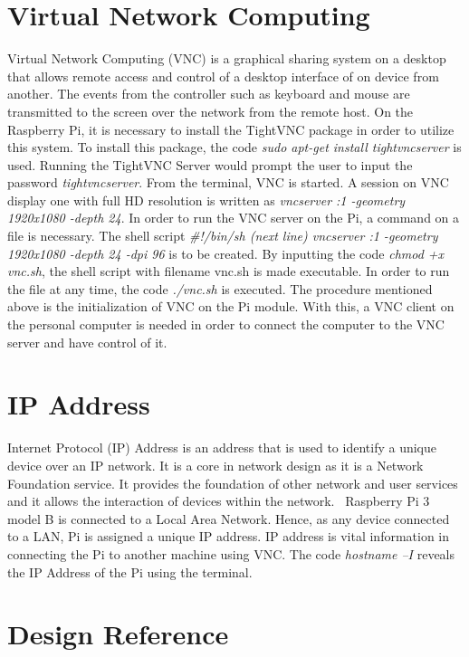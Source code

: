 \section{Virtual Network Computing}
Virtual Network Computing (VNC) is a graphical sharing system on a desktop that allows remote access and control of a desktop interface of on device from another. The events from the controller such as keyboard and mouse are transmitted to the screen over the network from the remote host. 
	On the Raspberry Pi, it is necessary to install the TightVNC package in order to utilize this system. To install this package, the code  \textsl{sudo apt-get install tightvncserver} is used. Running the TightVNC Server would prompt the user to input the password \textsl{tightvncserver}. From the terminal, VNC is started. A session on VNC display one with full HD resolution is written as \textsl{vncserver :1 -geometry 1920x1080 -depth 24}.
	In order to run the VNC server on the Pi, a command on a file is necessary. The shell script \textsl{#!/bin/sh (next line) vncserver :1 -geometry 1920x1080 -depth 24 -dpi 96} is to be created. By inputting the code \textsl{chmod +x vnc.sh}, the shell script with filename vnc.sh is made executable. In order to run the file at any time, the code \textsl{./vnc.sh} is executed.
	The procedure mentioned above is the initialization of VNC on the Pi module. With this, a VNC client on the personal computer is needed in order to connect the computer to the VNC server and have control of it.~\cite{vnc}
	
\section{IP Address}
	Internet Protocol (IP) Address is an address that is used to identify a unique device over an IP network. It is a core in network design as it is a Network Foundation service. It provides the foundation of other network and user services and it allows the interaction of devices within the network.~\cite{cisco}
	Raspberry Pi 3 model B is connected to a Local Area Network. Hence, as any device connected to a LAN, Pi is assigned a unique IP address. IP address is vital information in connecting the Pi to another machine using VNC. The code \textsl{hostname –I} reveals the IP Address of the Pi using the terminal.
		





\section{Design Reference}

